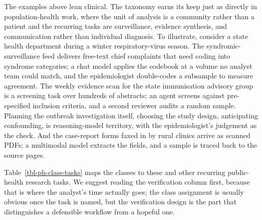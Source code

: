 \documentclass[
  letterpaper,
  11pt]{scrbook}
\begin{document}
The examples above lean clinical. The taxonomy earns its keep just as
directly in population-health work, where the unit of analysis is a
community rather than a patient and the recurring tasks are
surveillance, evidence synthesis, and communication rather than
individual diagnosis. To illustrate, consider a state health department
during a winter respiratory-virus season. The syndromic-surveillance
feed delivers free-text chief complaints that need coding into syndrome
categories; a chat model applies the codebook at a volume no analyst
team could match, and the epidemiologist double-codes a subsample to
measure agreement. The weekly evidence scan for the state immunisation
advisory group is a screening task over hundreds of abstracts; an agent
screens against pre-specified inclusion criteria, and a second reviewer
audits a random sample. Planning the outbreak investigation itself,
choosing the study design, anticipating confounding, is reasoning-model
territory, with the epidemiologist's judgement as the check. And the
case-report forms faxed in by rural clinics arrive as scanned PDFs; a
multimodal model extracts the fields, and a sample is traced back to the
source pages.

Table~\ref{tbl-ph-class-tasks} maps the classes to these and other
recurring public-health research tasks. We suggest reading the
verification column first, because that is where the analyst's time
actually goes; the class assignment is usually obvious once the task is
named, but the verification design is the part that distinguishes a
defensible workflow from a hopeful one.
\end{document}
